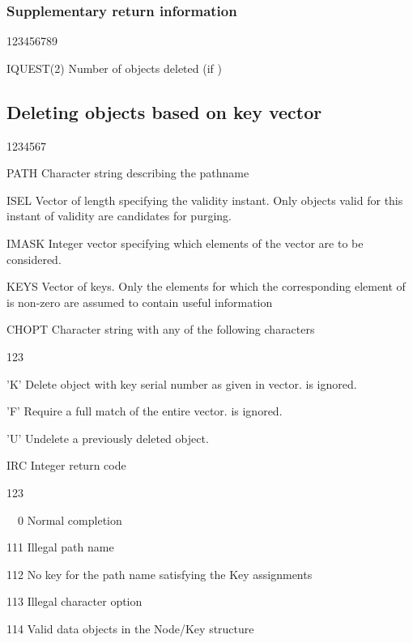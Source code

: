 \subsubsection*{Supplementary return information}

\begin{DLtt}{123456789}
\item[IQUEST(2)]Number of objects deleted (if )
%
\end{DLtt}

\subsection{Deleting objects based on key vector}


\begin{DLtt}{1234567}
\item[PATH]Character string describing the pathname
\item[ISEL]Vector of length  specifying the validity instant.
  Only objects valid for this instant of validity are candidates for purging.
\item[IMASK]Integer vector specifying which elements of the 
  vector are to be considered.
\item[KEYS]Vector of keys. Only the elements for which the corresponding
  element of  is non-zero are assumed to contain useful information
\item[CHOPT]Character string with any of the following characters
  \begin{DLtt}{123}
    \item['K']Delete object with key serial number as given in  vector.
       is ignored.
    \item['F']Require a full match of the entire  vector.
       is ignored.
    \item['U']Undelete a previously deleted object.
  \end{DLtt}
\item[IRC]Integer return code
  \begin{DLtt}{123}
    \item[\ \ 0]Normal completion
    \item[111]Illegal path name
    \item[112]No key for the path name satisfying the Key assignments
    \item[113]Illegal character option
    \item[114]Valid data objects in the Node/Key structure
  \end{DLtt}
\end{DLtt}


